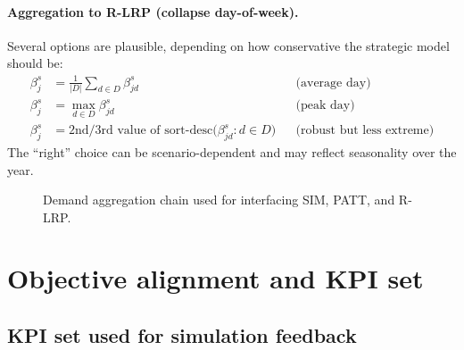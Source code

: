 \documentclass[11pt,a4paper]{article}
\begin{document}
\paragraph{Aggregation to R-LRP (collapse day-of-week).}
Several options are plausible, depending on how conservative the strategic model should be:
\begin{align}
  \beta^{s}_{j} &= \frac{1}{|D|}\sum_{d\in D} \beta^{s}_{jd} 
  &&\text{(average day)} \label{eq:patt-to-rlrp-avg}\\
  \beta^{s}_{j} &= \max_{d\in D} \beta^{s}_{jd} 
  &&\text{(peak day)} \label{eq:patt-to-rlrp-max}\\
  \beta^{s}_{j} &= \text{2nd/3rd value of }\text{sort-desc}\bigl(\beta^{s}_{jd}:d\in D\bigr)
  &&\text{(robust but less extreme)} \label{eq:patt-to-rlrp-quant}
\end{align}
The ``right'' choice can be scenario-dependent and may reflect seasonality over the year.

\begin{figure}[t]
\centering
{}
\caption{Demand aggregation chain used for interfacing SIM, PATT, and R-LRP.}
\label{fig:demandchain}
\end{figure}

\section{Objective alignment and KPI set}

\subsection{KPI set used for simulation feedback}
\end{document}
